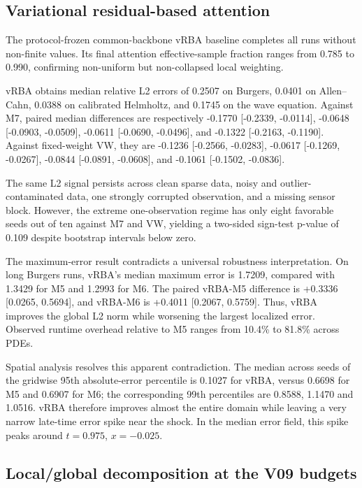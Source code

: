\documentclass[
  11pt,
]{article}
\begin{document}
\hypertarget{variational-residual-based-attention}{%
\subsection{Variational residual-based
attention}\label{variational-residual-based-attention}}

The protocol-frozen common-backbone vRBA baseline completes all runs
without non-finite values. Its final attention effective-sample fraction
ranges from 0.785 to 0.990, confirming non-uniform but non-collapsed
local weighting.

vRBA obtains median relative L2 errors of 0.2507 on Burgers, 0.0401 on
Allen--Cahn, 0.0388 on calibrated Helmholtz, and 0.1745 on the wave
equation. Against M7, paired median differences are respectively -0.1770
{[}-0.2339, -0.0114{]}, -0.0648 {[}-0.0903, -0.0509{]}, -0.0611
{[}-0.0690, -0.0496{]}, and -0.1322 {[}-0.2163, -0.1190{]}. Against
fixed-weight VW, they are -0.1236 {[}-0.2566, -0.0283{]}, -0.0617
{[}-0.1269, -0.0267{]}, -0.0844 {[}-0.0891, -0.0608{]}, and -0.1061
{[}-0.1502, -0.0836{]}.

The same L2 signal persists across clean sparse data, noisy and outlier-
contaminated data, one strongly corrupted observation, and a missing
sensor block. However, the extreme one-observation regime has only eight
favorable seeds out of ten against M7 and VW, yielding a two-sided
sign-test p-value of 0.109 despite bootstrap intervals below zero.

The maximum-error result contradicts a universal robustness
interpretation. On long Burgers runs, vRBA's median maximum error is
1.7209, compared with 1.3429 for M5 and 1.2993 for M6. The paired
vRBA-M5 difference is +0.3336 {[}0.0265, 0.5694{]}, and vRBA-M6 is
+0.4011 {[}0.2067, 0.5759{]}. Thus, vRBA improves the global L2 norm
while worsening the largest localized error. Observed runtime overhead
relative to M5 ranges from 10.4\% to 81.8\% across PDEs.

Spatial analysis resolves this apparent contradiction. The median across
seeds of the gridwise 95th absolute-error percentile is 0.1027 for vRBA,
versus 0.6698 for M5 and 0.6907 for M6; the corresponding 99th
percentiles are 0.8588, 1.1470 and 1.0516. vRBA therefore improves
almost the entire domain while leaving a very narrow late-time error
spike near the shock. In the median error field, this spike peaks around
\(t=0.975\), \(x=-0.025\).

\hypertarget{localglobal-decomposition-at-the-v09-budgets}{%
\subsection{Local/global decomposition at the V09
budgets}\label{localglobal-decomposition-at-the-v09-budgets}}
\end{document}
